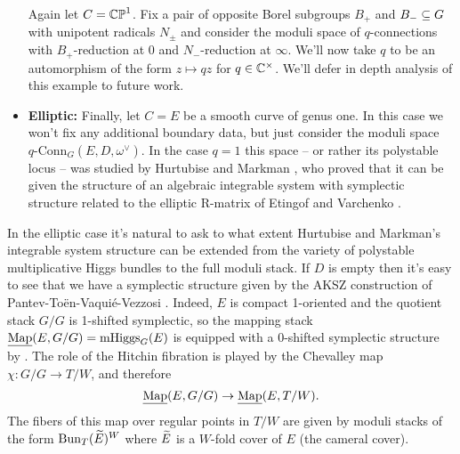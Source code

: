 \documentclass[10pt, oneside]{article}
\DeclareMathOperator{\mhiggs}{mHiggs}
\newcommand{\map}{\ul{\mr{Map}}}
\newcommand{\qconn}{q\text{-Conn}}
\begin{document}
\begin{examples}
\begin{itemize}
  Again let $C = \mathbb{CP}^1$.  Fix a pair of opposite Borel subgroups $B_+$ and $B_- \subseteq G$ with unipotent radicals $N_\pm$ and consider the moduli space of $q$-connections with $B_+$-reduction at $0$ and $N_-$-reduction at $\infty$.  We'll now take $q$ to be an automorphism of the form $z \mapsto qz$ for $q \in \mathbb{C}^\times$.  We'll defer in depth analysis of this example to future work.
  \item \textbf{Elliptic:} Finally, let $C = E$ be a smooth curve of genus one.  In this case we won't fix any additional boundary data, but just consider the moduli space $\qconn_G(E,D, \omega^\vee)$.  In the case $q = 1$ this space -- or rather its polystable locus -- was studied by Hurtubise and Markman \cite{HurtubiseMarkman}, who proved that it can be given the structure of an algebraic integrable system with symplectic structure related to the elliptic R-matrix of Etingof and Varchenko \cite{EtingofVarchenko}.
 \end{itemize}
\end{examples}



\begin{remark}
In the elliptic case it's natural to ask to what extent Hurtubise and Markman's integrable system structure can be extended from the variety of polystable multiplicative Higgs bundles to the full moduli stack.  If $D$ is empty then it's easy to see that we have a symplectic structure given by the AKSZ construction of Pantev-To\"en-Vaqui\'e-Vezzosi \cite{PTVV}.  Indeed, $E$ is compact 1-oriented and the quotient stack $G/G$ is 1-shifted symplectic, so the mapping stack $\map(E, G/G) = \mhiggs_G(E)$ is equipped with a 0-shifted symplectic structure by \cite[Theorem 2.5]{PTVV}.  The role of the Hitchin fibration is played by the Chevalley map $\chi \colon G/G \to T/W$, and therefore
\[\map(E,G/G) \to \map(E,T/W).\]
The fibers of this map over regular points in $T/W$ are given by moduli stacks of the form $\operatorname{Bun}_T(\widetilde{E})^W$ where $\widetilde{E}$ is a $W$-fold cover of $E$ (the cameral cover). 
\end{remark}
\end{document}
